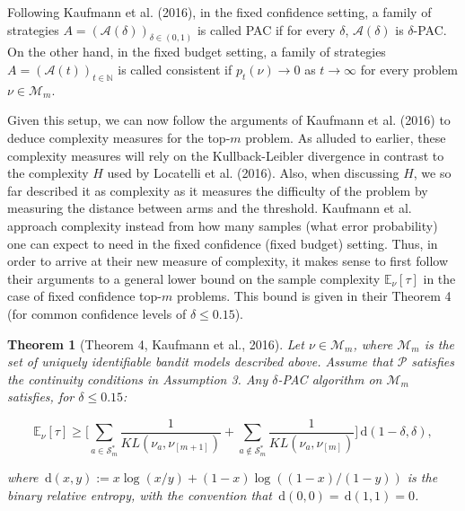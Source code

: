 \documentclass[11pt,]{article}
\newtheorem{theorem}{Theorem}
\newcommand{\der}{\,\text{d}}
\begin{document}
Following Kaufmann et al. (2016), in the fixed confidence setting, a
family of strategies \(A = (\mathcal{A}(\delta))_{\delta \in (0,1)}\) is
called PAC if for every \(\delta\), \(\mathcal{A}(\delta)\) is
\(\delta\)-PAC. On the other hand, in the fixed budget setting, a family
of strategies \(A = (\mathcal{A}(t))_{t \in \mathbb{N}}\) is called
consistent if \(p_t(\nu) \rightarrow 0\) as \(t \rightarrow \infty\) for
every problem \(\nu \in \mathcal{M}_m\).

Given this setup, we can now follow the arguments of Kaufmann et al.
(2016) to deduce complexity measures for the top-\(m\) problem. As
alluded to earlier, these complexity measures will rely on the
Kullback-Leibler divergence in contrast to the complexity \(H\) used by
Locatelli et al. (2016). Also, when discussing \(H\), we so far
described it as complexity as it measures the difficulty of the problem
by measuring the distance between arms and the threshold. Kaufmann et
al. approach complexity instead from how many samples (what error
probability) one can expect to need in the fixed confidence (fixed
budget) setting. Thus, in order to arrive at their new measure of
complexity, it makes sense to first follow their arguments to a general
lower bound on the sample complexity \(\mathbb{E}_{\nu}[\tau]\) in the
case of fixed confidence top-\(m\) problems. This bound is given in
their Theorem 4 (for common confidence levels of \(\delta \leq 0.15\)).

\begin{theorem}[Theorem 4, Kaufmann et al., 2016] \label{theorem:KaufmannEtAlTheorem4}
Let $\nu \in \mathcal{M}_m$, where $\mathcal{M}_m$ is the set of uniquely identifiable bandit models described above. Assume that $\mathcal{P}$ satisfies the continuity conditions in Assumption 3. Any $\delta$-PAC algorithm on $\mathcal{M}_m$ satisfies, for $\delta \leq 0.15$:

\begin{equation*}
\mathbb{E}_{\nu}[\tau] \geq \Big[ \sum_{a \in \mathcal{S}^*_m} \frac{1}{KL(\nu_a, \nu_{[m+1]})} + \sum_{a \notin \mathcal{S}^*_m} \frac{1}{KL(\nu_a, \nu_{[m]})} \Big] \der(1-\delta, \delta),
\end{equation*}

where $\der(x,y) := x \log(x/y) + (1-x) \log((1-x)/(1-y))$ is the binary relative entropy, with the convention that $\der(0,0) = \der(1,1) = 0$.
\end{theorem}
\end{document}
